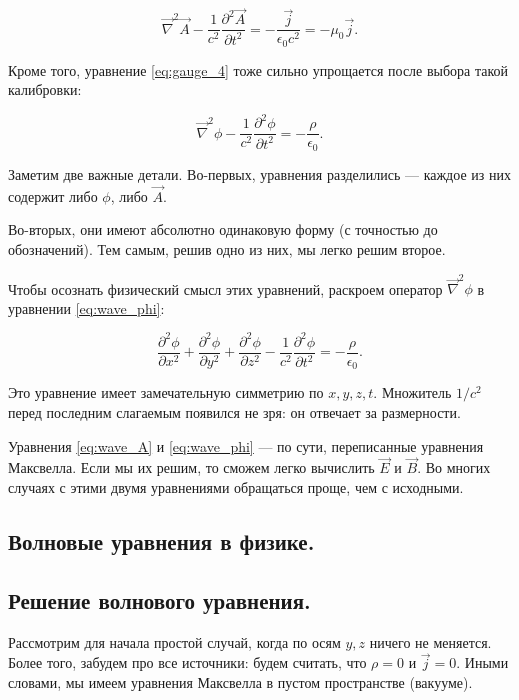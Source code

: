 \documentclass[11pt,a4paper]{article}
\numberwithin{equation}{section}
\newcommand{\pt}{\partial}
\newcommand{\vn}{\vec{\nabla}}
\newcommand{\eps}{\epsilon}
\begin{document}
\begin{equation}
  \label{eq:wave_A}
  \vn^2 \vec{A} - \frac{1}{c^2} \frac{\pt^2 \vec{A}}{\pt t^2} = -
  \frac{\vec{j}}{\eps_0 c^2} = -\mu_0 \vec{j}.
\end{equation}

Кроме того, уравнение \eqref{eq:gauge_4} тоже сильно упрощается после
выбора такой калибровки: 

\begin{equation}
  \label{eq:wave_phi}
  \vn^2 \phi - \frac{1}{c^2} \frac{\pt^2 \phi}{\pt t^2} = - \frac{\rho}{\eps_0}.
\end{equation}

Заметим две важные детали. Во-первых, уравнения разделились --- каждое
из них содержит либо $\phi$, либо $\vec{A}$. 

Во-вторых, они имеют абсолютно одинаковую форму (с точностью до
обозначений). Тем самым, решив одно из них, мы легко решим второе. 

Чтобы осознать физический смысл этих уравнений, раскроем оператор
$\vn^2 \phi$ в уравнении \eqref{eq:wave_phi}:

\begin{equation}
  \label{eq:wave_phi_expand}
  \frac{\pt^2 \phi}{\pt x^2} +   \frac{\pt^2 \phi}{\pt y^2} +
  \frac{\pt^2 \phi}{\pt z^2} -  \frac{1}{c^2}  \frac{\pt^2 \phi}{\pt t^2} = - \frac{\rho}{\eps_0}.
\end{equation}

Это уравнение имеет замечательную симметрию по $x,y,z,t$. Множитель
$1/c^2$ перед последним слагаемым появился не зря: он отвечает за
размерности. 

Уравнения \eqref{eq:wave_A} и \eqref{eq:wave_phi} --- по сути,
переписанные уравнения Максвелла. Если мы их решим, то сможем легко
вычислить $\vec{E}$ и $\vec{B}$. Во многих случаях с этими двумя
уравнениями обращаться проще, чем с исходными. 

\subsection{Волновые уравнения в физике. }
\label{sec:wave_equation}

\subsection{Решение волнового уравнения.}
\label{sec:wave_solution}

Рассмотрим для начала простой случай, когда по осям $y,z$ ничего не
меняется. Более того, забудем про все источники: будем считать, что
$\rho=0$ и $\vec{j}=0$. Иными словами, мы имеем уравнения Максвелла в
пустом пространстве (вакууме). 
\end{document}
